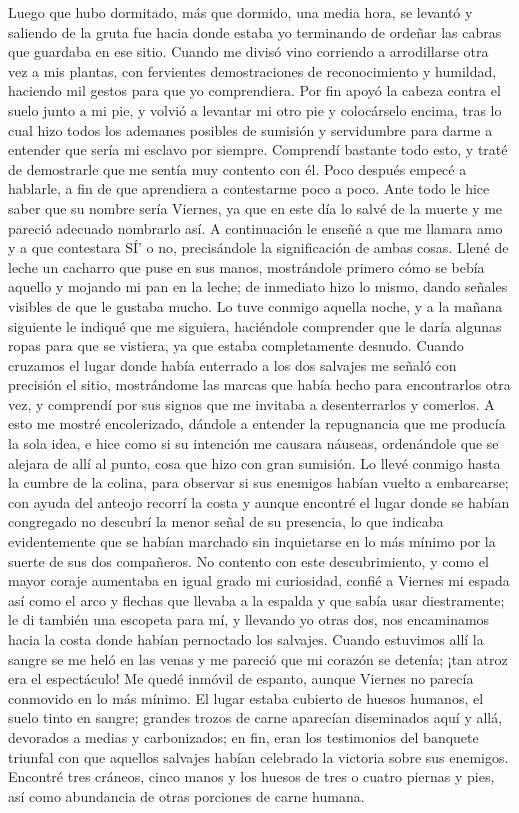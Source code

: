 \documentclass{novela}
\begin{document}
    Luego que hubo dormitado, más que dormido, una media hora, se levantó y saliendo de la gruta fue hacia donde estaba yo terminando de ordeñar las cabras que guardaba en ese sitio. Cuando me divisó vino corriendo a arrodillarse otra vez a mis plantas, con fervientes demostraciones de reconocimiento y humildad, haciendo mil gestos para que yo comprendiera. Por fin apoyó la cabeza contra el suelo junto a mi pie, y volvió a levantar mi otro pie y colocárselo encima, tras lo cual hizo todos los ademanes posibles de sumisión y servidumbre para darme a entender que sería mi esclavo por siempre. Comprendí bastante todo esto, y traté de demostrarle que me sentía muy contento con él. Poco después empecé a hablarle, a fin de que aprendiera a contestarme poco a poco. Ante todo le hice saber que su nombre sería Viernes, ya que en este día lo salvé de la muerte y me pareció adecuado nombrarlo así. A continuación le enseñé a que me llamara amo y a que contestara SÍ' o no, precisándole la significación de ambas cosas. Llené de leche un cacharro que puse en sus manos, mostrándole primero cómo se bebía aquello y mojando mi pan en la leche; de inmediato hizo lo mismo, dando señales visibles de que le gustaba mucho.
    Lo tuve conmigo aquella noche, y a la mañana siguiente le indiqué que me siguiera, haciéndole comprender que le daría algunas ropas para que se vistiera, ya que estaba completamente desnudo. Cuando cruzamos el lugar donde había enterrado a los dos salvajes me señaló con precisión el sitio, mostrándome las marcas que había hecho para encontrarlos otra vez, y comprendí por sus signos que me invitaba a desenterrarlos y comerlos. A esto me mostré encolerizado, dándole a entender la repugnancia que me producía la sola idea, e hice como si su intención me causara náuseas, ordenándole que se alejara de allí al punto, cosa que hizo con gran sumisión. Lo llevé conmigo hasta la cumbre de la colina, para observar si sus enemigos habían vuelto a embarcarse; con ayuda del anteojo recorrí la costa y aunque encontré el lugar donde se habían congregado no descubrí la menor señal de su presencia, lo que indicaba evidentemente que se habían marchado sin inquietarse en lo más mínimo por la suerte de sus dos compañeros.
    No contento con este descubrimiento, y como el mayor coraje aumentaba en igual grado mi curiosidad, confié a Viernes mi espada así como el arco y flechas que llevaba a la espalda y que sabía usar diestramente; le di también una escopeta para mí, y llevando yo otras dos, nos encaminamos hacia la costa donde habían pernoctado los salvajes. Cuando estuvimos allí la sangre se me heló en las venas y me pareció que mi corazón se detenía; ¡tan atroz era el espectáculo! Me quedé inmóvil de espanto, aunque Viernes no parecía conmovido en lo más mínimo. El lugar estaba cubierto de huesos humanos, el suelo tinto en sangre; grandes trozos de carne aparecían diseminados aquí y allá, devorados a medias y carbonizados; en fin, eran los testimonios del banquete triunfal con que aquellos salvajes habían celebrado la victoria sobre sus enemigos. Encontré tres cráneos, cinco manos y los huesos de tres o cuatro piernas y pies, así como abundancia de otras porciones de carne humana.
\end{document}
